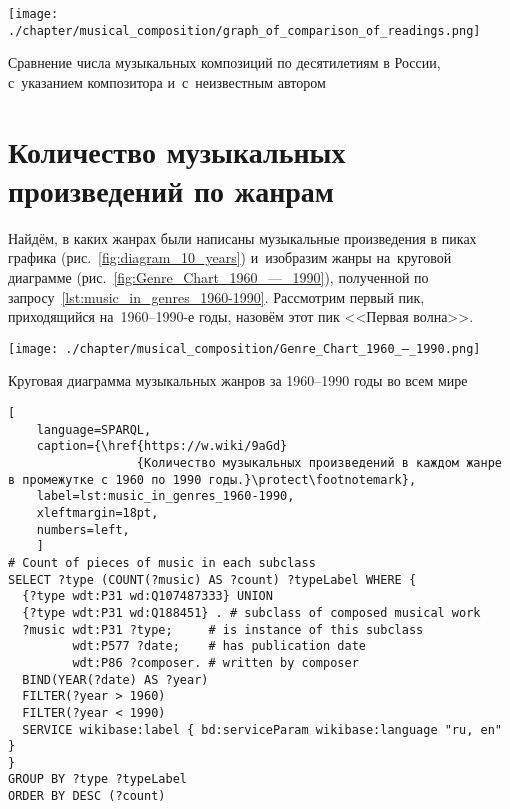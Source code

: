

\begin{marginfigure}[0\baselineskip]
	\texttt{[image: ./chapter/musical\_composition/graph\_of\_comparison\_of\_readings.png]}
	\caption{Сравнение числа музыкальных композиций по десятилетиям в России,  
             с~указанием композитора и~с~неизвестным автором}%
	\label{fig:CompareRuMusComposerWithout}%
\end{marginfigure}





\newpage
\section{Количество музыкальных произведений по жанрам}
\label{chapter:Number-of-musical-works-by-genre}

Найдём, в каких жанрах были написаны музыкальные произведения 
в пиках графика (рис.~\ref{fig:diagram_10_years}) 
и~изобразим жанры на~круговой диаграмме (рис.~\ref{fig:Genre_Chart_1960_—_1990}), 
полученной по запросу~\ref{lst:music_in_genres_1960-1990}. 
Рассмотрим первый пик, приходящийся на~1960--1990-е годы, назовём этот пик <<Первая волна>>.

\begin{marginfigure}[0\baselineskip]
	\texttt{[image: ./chapter/musical\_composition/Genre\_Chart\_1960\_—\_1990.png]}
	\caption{Круговая диаграмма музыкальных жанров за 1960--1990 годы во всем мире}%
	\label{fig:Genre_Chart_1960_—_1990}%
\end{marginfigure}

\begin{lstlisting}[ 
    language=SPARQL,
    caption={\href{https://w.wiki/9aGd}
                  {Количество музыкальных произведений в каждом жанре в промежутке с 1960 по 1990 годы.}\protect\footnotemark},
    label=lst:music_in_genres_1960-1990,
    xleftmargin=18pt,
    numbers=left,
    ]
# Count of pieces of music in each subclass
SELECT ?type (COUNT(?music) AS ?count) ?typeLabel WHERE {
  {?type wdt:P31 wd:Q107487333} UNION 
  {?type wdt:P31 wd:Q188451} . # subclass of composed musical work
  ?music wdt:P31 ?type;     # is instance of this subclass
         wdt:P577 ?date;    # has publication date
         wdt:P86 ?composer. # written by composer
  BIND(YEAR(?date) AS ?year)
  FILTER(?year > 1960)        
  FILTER(?year < 1990)
  SERVICE wikibase:label { bd:serviceParam wikibase:language "ru, en" }
}
GROUP BY ?type ?typeLabel
ORDER BY DESC (?count)
\end{lstlisting}%

